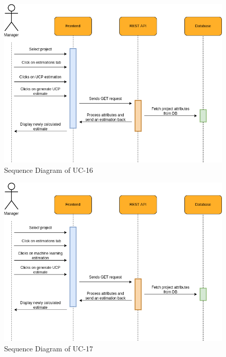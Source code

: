 \begin{figure}[H]
    \centering
    \includegraphics[scale=0.5]{./diagrams/sequence/seq-16.png}
    \caption{Sequence Diagram of UC-16}
    \label{fig:seq-16}
    
\end{figure}


\begin{figure}[H]
    \centering
    \includegraphics[scale=0.5]{./diagrams/sequence/seq-17.png}
    \caption{Sequence Diagram of UC-17}
    \label{fig:seq-17}
    
\end{figure}


